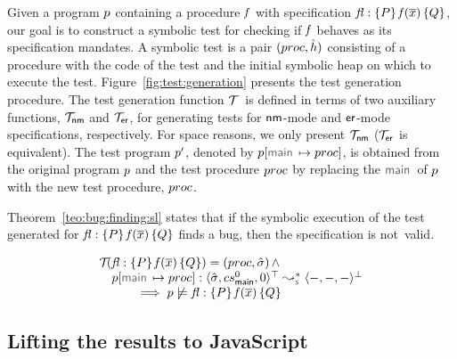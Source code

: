 Given a \jsil program $p$ containing a procedure $\mathit{f}$ with specification {\small ${\mathit{fl}} : \{ P \} \, \mathit{f}(\overline{x}) \, \{ Q \}$}, 
our goal is to construct a symbolic test for checking if $\mathit{f}$ behaves as its specification mandates.
A symbolic test is a pair $(proc, \hat{h})$ consisting of a \jsil procedure with the code of the test and the initial 
symbolic heap on which to execute the test. 
%
Figure~\ref{fig:test:generation} presents the test generation procedure. 
The test generation function $\mathcal{T}_{} \ $ is defined in terms 
of two auxiliary functions, $\mathcal{T}_{{\sf nm}}$ and $\mathcal{T}_{{\sf er}}$, for generating tests for ${\sf nm}$-mode and 
${\sf er}$-mode specifications, respectively. 
For space reasons, we only present $\mathcal{T}_{{\sf nm}}$ ($\mathcal{T}_{{\sf er}}$ is equivalent). 
The test program $p'$, denoted by $\prog[\jsilmain \mapsto \proc]$, is obtained from the original program $p$ and the test procedure $proc$ by replacing the 
$\jsilmain$ of $p$ with the new test procedure, $proc$. 

Theorem~\ref{teo:bug:finding:sl} states that if the symbolic execution of the 
test generated for ${\mathit{fl}} : \{ P \} \, \mathit{f}(\overline{x}) \, \{ Q \}$ finds a bug, then the specification 
is not~valid.

\begin{theorem}\label{teo:bug:finding:sl}
$$
\begin{array}{l}
\testify{}(\specsig{\pass}{\pid(\jvec{x})}{\qass}{\flag})  = (\proc, \sstate) \, \wedge \\
\quad
  \prog[\jsilmain \mapsto \proc] :  \transabssemrule{\sstate, \csmain, 0}{-, -, -}{\top}{\bot}{\symbolic} \\ \quad \qquad 
    \implies  
         \prog \not\satisfies \specsig{\pass}{\pid(\jvec{x})}{\qass}{\flag}
\end{array}
$$
\end{theorem}


\subsection{Lifting the results to JavaScript}\label{js:specs}

